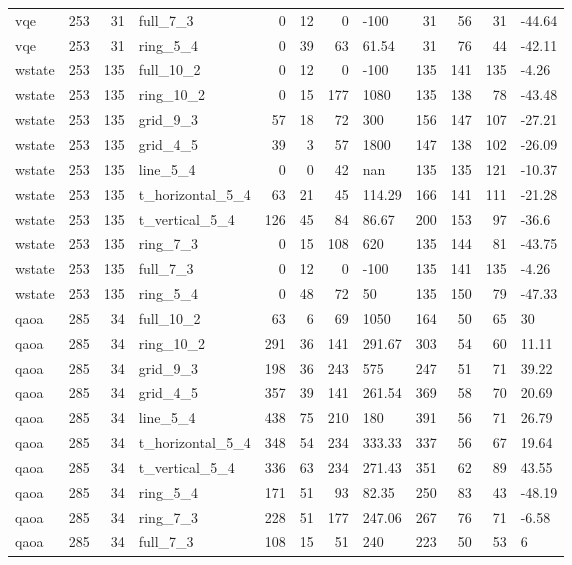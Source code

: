 \begin{longtable}{lrrlrrrlrrrl}
vqe & 253 & 31 & full\_7\_3 & 0 & 12 & 0 & -100 & 31 & 56 & 31 & -44.64 \\
vqe & 253 & 31 & ring\_5\_4 & 0 & 39 & 63 & 61.54 & 31 & 76 & 44 & -42.11 \\
wstate & 253 & 135 & full\_10\_2 & 0 & 12 & 0 & -100 & 135 & 141 & 135 & -4.26 \\
wstate & 253 & 135 & ring\_10\_2 & 0 & 15 & 177 & 1080 & 135 & 138 & 78 & -43.48 \\
wstate & 253 & 135 & grid\_9\_3 & 57 & 18 & 72 & 300 & 156 & 147 & 107 & -27.21 \\
wstate & 253 & 135 & grid\_4\_5 & 39 & 3 & 57 & 1800 & 147 & 138 & 102 & -26.09 \\
wstate & 253 & 135 & line\_5\_4 & 0 & 0 & 42 & nan & 135 & 135 & 121 & -10.37 \\
wstate & 253 & 135 & t\_horizontal\_5\_4 & 63 & 21 & 45 & 114.29 & 166 & 141 & 111 & -21.28 \\
wstate & 253 & 135 & t\_vertical\_5\_4 & 126 & 45 & 84 & 86.67 & 200 & 153 & 97 & -36.6 \\
wstate & 253 & 135 & ring\_7\_3 & 0 & 15 & 108 & 620 & 135 & 144 & 81 & -43.75 \\
wstate & 253 & 135 & full\_7\_3 & 0 & 12 & 0 & -100 & 135 & 141 & 135 & -4.26 \\
wstate & 253 & 135 & ring\_5\_4 & 0 & 48 & 72 & 50 & 135 & 150 & 79 & -47.33 \\
qaoa & 285 & 34 & full\_10\_2 & 63 & 6 & 69 & 1050 & 164 & 50 & 65 & 30 \\
qaoa & 285 & 34 & ring\_10\_2 & 291 & 36 & 141 & 291.67 & 303 & 54 & 60 & 11.11 \\
qaoa & 285 & 34 & grid\_9\_3 & 198 & 36 & 243 & 575 & 247 & 51 & 71 & 39.22 \\
qaoa & 285 & 34 & grid\_4\_5 & 357 & 39 & 141 & 261.54 & 369 & 58 & 70 & 20.69 \\
qaoa & 285 & 34 & line\_5\_4 & 438 & 75 & 210 & 180 & 391 & 56 & 71 & 26.79 \\
qaoa & 285 & 34 & t\_horizontal\_5\_4 & 348 & 54 & 234 & 333.33 & 337 & 56 & 67 & 19.64 \\
qaoa & 285 & 34 & t\_vertical\_5\_4 & 336 & 63 & 234 & 271.43 & 351 & 62 & 89 & 43.55 \\
qaoa & 285 & 34 & ring\_5\_4 & 171 & 51 & 93 & 82.35 & 250 & 83 & 43 & -48.19 \\
qaoa & 285 & 34 & ring\_7\_3 & 228 & 51 & 177 & 247.06 & 267 & 76 & 71 & -6.58 \\
qaoa & 285 & 34 & full\_7\_3 & 108 & 15 & 51 & 240 & 223 & 50 & 53 & 6 \\

\end{longtable}
